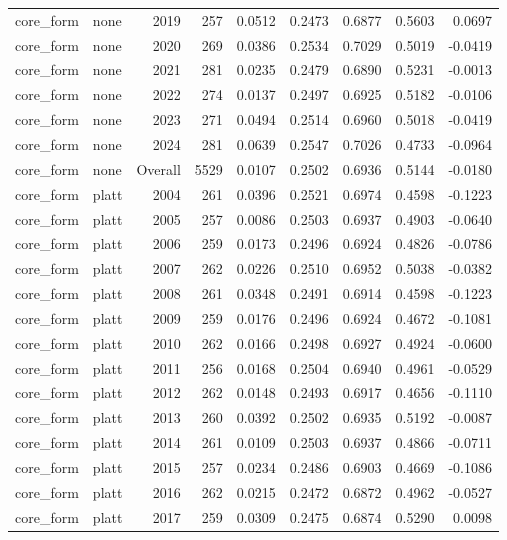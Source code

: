 \begin{table}[t]
\begin{tabular}{@{} l l r r r r r r r @{} }
      core\_form & none & 2019 & 257 & 0.0512 & 0.2473 & 0.6877 & 0.5603 & 0.0697 \\
      core\_form & none & 2020 & 269 & 0.0386 & 0.2534 & 0.7029 & 0.5019 & -0.0419 \\
      core\_form & none & 2021 & 281 & 0.0235 & 0.2479 & 0.6890 & 0.5231 & -0.0013 \\
      core\_form & none & 2022 & 274 & 0.0137 & 0.2497 & 0.6925 & 0.5182 & -0.0106 \\
      core\_form & none & 2023 & 271 & 0.0494 & 0.2514 & 0.6960 & 0.5018 & -0.0419 \\
      core\_form & none & 2024 & 281 & 0.0639 & 0.2547 & 0.7026 & 0.4733 & -0.0964 \\
      core\_form & none & Overall & 5529 & 0.0107 & 0.2502 & 0.6936 & 0.5144 & -0.0180 \\
      core\_form & platt & 2004 & 261 & 0.0396 & 0.2521 & 0.6974 & 0.4598 & -0.1223 \\
      core\_form & platt & 2005 & 257 & 0.0086 & 0.2503 & 0.6937 & 0.4903 & -0.0640 \\
      core\_form & platt & 2006 & 259 & 0.0173 & 0.2496 & 0.6924 & 0.4826 & -0.0786 \\
      core\_form & platt & 2007 & 262 & 0.0226 & 0.2510 & 0.6952 & 0.5038 & -0.0382 \\
      core\_form & platt & 2008 & 261 & 0.0348 & 0.2491 & 0.6914 & 0.4598 & -0.1223 \\
      core\_form & platt & 2009 & 259 & 0.0176 & 0.2496 & 0.6924 & 0.4672 & -0.1081 \\
      core\_form & platt & 2010 & 262 & 0.0166 & 0.2498 & 0.6927 & 0.4924 & -0.0600 \\
      core\_form & platt & 2011 & 256 & 0.0168 & 0.2504 & 0.6940 & 0.4961 & -0.0529 \\
      core\_form & platt & 2012 & 262 & 0.0148 & 0.2493 & 0.6917 & 0.4656 & -0.1110 \\
      core\_form & platt & 2013 & 260 & 0.0392 & 0.2502 & 0.6935 & 0.5192 & -0.0087 \\
      core\_form & platt & 2014 & 261 & 0.0109 & 0.2503 & 0.6937 & 0.4866 & -0.0711 \\
      core\_form & platt & 2015 & 257 & 0.0234 & 0.2486 & 0.6903 & 0.4669 & -0.1086 \\
      core\_form & platt & 2016 & 262 & 0.0215 & 0.2472 & 0.6872 & 0.4962 & -0.0527 \\
      core\_form & platt & 2017 & 259 & 0.0309 & 0.2475 & 0.6874 & 0.5290 & 0.0098 \\

\end{tabular}
\end{table}
